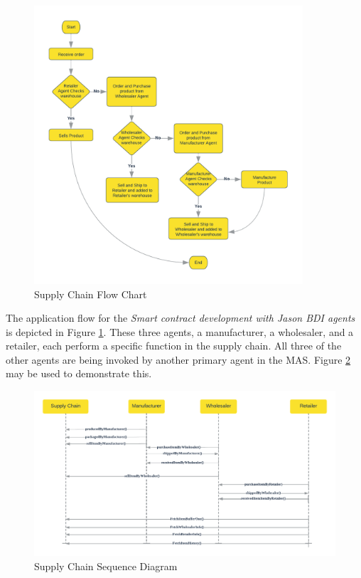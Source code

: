     \begin{figure}[h]
    \centering
      \includegraphics[width=10cm]{includes/figures/Flow Chart.png}
      \caption{Supply Chain Flow Chart}
      \label{Flow chart}
    \end{figure}

\vspace{.5cm}

The application flow for the \textit{Smart contract development with Jason \ac{BDI} agents} is depicted in Figure  \ref{Flow chart}. These three agents, a manufacturer, a wholesaler, and a retailer, each perform a specific function in the supply chain. All three of the other agents are being invoked by another primary agent in the \ac{MAS}. Figure \ref{Sequence Diagram} may be used to demonstrate this.

   \begin{figure}[h]
    \centering
      \includegraphics[width=\linewidth]{includes/figures/Sequence diagram.png} 
      \caption{Supply Chain Sequence Diagram}
      \label{Sequence Diagram}
    \end{figure}

